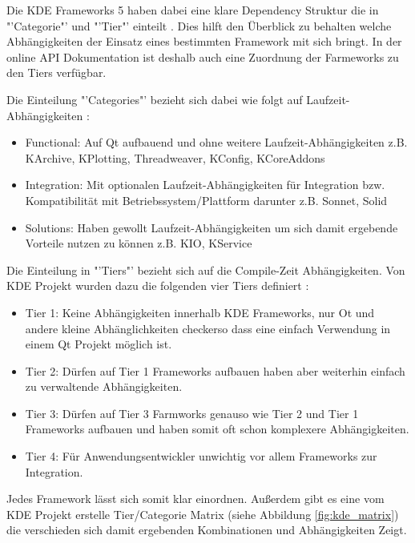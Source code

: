 \documentclass[10pt,a4paper,twocolumn]{article}
\begin{document}
Die KDE Frameworks 5 haben dabei eine klare Dependency Struktur die in "'Categorie"' und "'Tier"' einteilt \cite{KDEFramework5}. Dies hilft den Überblick zu behalten welche Abhängigkeiten der Einsatz eines bestimmten Framework mit sich bringt. In der online API Dokumentation ist deshalb auch eine Zuordnung der Farmeworks zu den Tiers verfügbar.

Die Einteilung "'Categories"' bezieht sich dabei wie folgt auf Laufzeit-Abhängigkeiten \cite{KDEFramework5}:
\begin{itemize}
\setlength\itemsep{0em}
\item Functional: Auf Qt aufbauend und ohne weitere Laufzeit-Abhängigkeiten z.B. KArchive, KPlotting, Threadweaver, KConfig, KCoreAddons

\item Integration: Mit optionalen Laufzeit-Abhängigkeiten für Integration bzw. Kompatibilität mit Betriebssystem/Plattform darunter z.B. Sonnet, Solid

\item Solutions: Haben gewollt Laufzeit-Abhängigkeiten um sich damit ergebende Vorteile nutzen zu können z.B. KIO, KService
\end{itemize}

Die Einteilung in "'Tiers"' bezieht sich auf die Compile-Zeit Abhängigkeiten. Von KDE Projekt wurden dazu die folgenden vier Tiers definiert \cite{KDEFramework5}:
\begin{itemize}
\setlength\itemsep{0em}
\item Tier 1: Keine Abhängigkeiten innerhalb KDE Frameworks, nur Ot und andere kleine Abhänglichkeiten  checkerso dass eine einfach Verwendung in einem Qt Projekt möglich ist. 

\item Tier 2: Dürfen auf Tier 1 Frameworks aufbauen haben aber weiterhin einfach zu verwaltende Abhängigkeiten.

\item Tier 3: Dürfen auf Tier 3 Farmworks genauso wie Tier 2 und Tier 1 Frameworks aufbauen und haben somit oft schon komplexere Abhängigkeiten.

\item Tier 4: Für Anwendungsentwickler unwichtig vor allem Frameworks zur Integration. 
\end{itemize}

Jedes Framework lässt sich somit klar einordnen. Außerdem gibt es eine vom KDE Projekt erstelle Tier/Categorie Matrix (siehe Abbildung \ref{fig:kde_matrix}) die verschieden sich damit ergebenden Kombinationen und Abhängigkeiten Zeigt.
\end{document}

